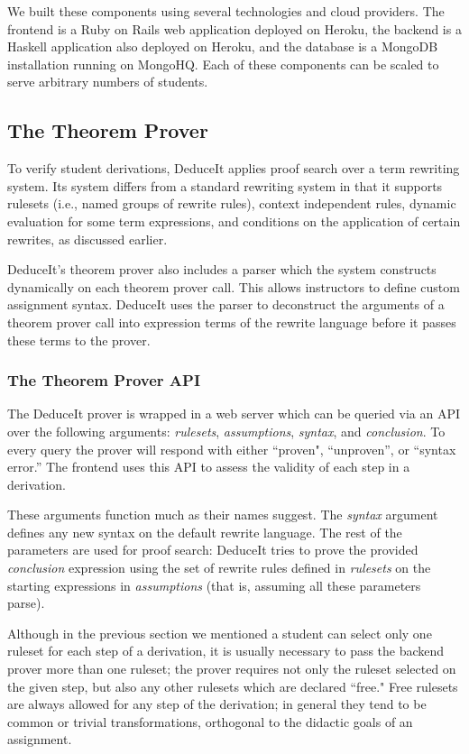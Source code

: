 \documentclass{sigchi}
\begin{document}
We built these components using several technologies and cloud providers. The frontend is a Ruby on Rails web application deployed on Heroku, the backend is a Haskell application also deployed on Heroku, and the database is a MongoDB installation running on MongoHQ. Each of these components can be scaled to serve arbitrary numbers of students.

\subsection{The Theorem Prover}

To verify student derivations, DeduceIt applies proof search over a term rewriting system. Its system differs from a standard rewriting system in that it supports rulesets (i.e., named groups of rewrite rules), context independent rules, dynamic evaluation for some term expressions, and conditions on the application of certain rewrites, as discussed earlier.

DeduceIt's theorem prover also includes a parser which the system constructs dynamically on each theorem prover call. This allows instructors to define custom assignment syntax. DeduceIt uses the parser to deconstruct the arguments of a theorem prover call into expression terms of the rewrite language before it passes these terms to the prover.

\subsubsection{The Theorem Prover API}

The DeduceIt prover is wrapped in a web server which can be queried via an API over the following arguments: \textit{rulesets}, \textit{assumptions}, \textit{syntax}, and \textit{conclusion}. To every query the prover will respond with either ``proven", ``unproven'', or ``syntax error.'' The frontend uses this API to assess the validity of each step in a derivation.

These arguments function much as their names suggest. The \textit{syntax} argument defines any new syntax on the default rewrite language. The rest of the parameters are used for proof search: DeduceIt tries to prove the provided \textit{conclusion} expression using the set of rewrite rules defined in \textit{rulesets} on the starting expressions in \textit{assumptions} (that is, assuming all these parameters parse). 

Although in the previous section we mentioned a student can select only one ruleset for each step of a derivation, it is usually necessary to pass the backend prover more than one ruleset; the prover requires not only the ruleset selected on the given step, but also any other rulesets which are declared ``free." Free rulesets are always allowed for any step of the derivation; in general they tend to be common or trivial transformations, orthogonal to the didactic goals of an assignment. 
\end{document}
